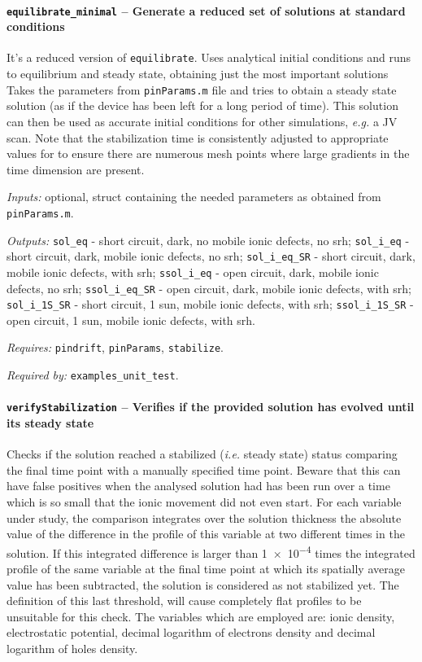 \paragraph{\texttt{equilibrate\_minimal} -- Generate a reduced set of solutions at standard conditions}
It's a reduced version of \texttt{equilibrate}. 
Uses analytical initial conditions and runs to equilibrium and steady state, obtaining just the most important solutions
 Takes the parameters from \texttt{pinParams.m} file and tries
 to obtain a steady state solution (as if the device has been left for
 a long period of time). This solution can then be used as accurate
 initial conditions for other simulations, \textsl{e.g.} a JV scan.
 Note that the stabilization time is consistently adjusted to appropriate values for to
 ensure there are numerous mesh points where large gradients in the time
 dimension are present.
 
\textit{Inputs:} optional, struct containing the needed parameters as obtained
     from \texttt{pinParams.m}.
     
\textit{Outputs:} \texttt{sol\_eq} - short circuit, dark, no mobile ionic defects, no \gls{srh};
   \texttt{sol\_i\_eq} - short circuit, dark, mobile ionic defects, no \gls{srh};
   \texttt{sol\_i\_eq\_SR} - short circuit, dark, mobile ionic defects, with \gls{srh};
   \texttt{ssol\_i\_eq} - open circuit, dark, mobile ionic defects, no \gls{srh};
   \texttt{ssol\_i\_eq\_SR} - open circuit, dark, mobile ionic defects, with \gls{srh};
   \texttt{sol\_i\_1S\_SR} - short circuit, 1 sun, mobile ionic defects, with \gls{srh};
   \texttt{ssol\_i\_1S\_SR} - open circuit, 1 sun, mobile ionic defects, with \gls{srh}.

\textit{Requires:} \texttt{pindrift}, \texttt{pinParams}, \texttt{stabilize}.

\textit{Required by:} \texttt{examples\_unit\_test}.

		\paragraph{\texttt{verify\-Stabilization} -- Verifies if the provided solution has evolved until its steady state}\label{verifyStabilization}
Checks if the solution reached a stabilized (\textsl{i.e.} steady state) status comparing the final time point with a manually specified time point. Beware that this can have false positives when the analysed solution had
 has been run over a time which is so small that the ionic movement did not even start.
 For each variable under study, the comparison integrates over the solution thickness the absolute value of the difference in the profile of this variable at two different times in the solution.
 If this integrated difference is larger than \num{1e-4} times the integrated profile of the same variable at the final time point at which its spatially average value has been subtracted, the solution is considered as not stabilized yet.
 The definition of this last threshold, will cause completely flat profiles to be unsuitable for this check.
 The variables which are employed are: ionic density, electrostatic potential, decimal logarithm of electrons density and decimal logarithm of holes density.
 
